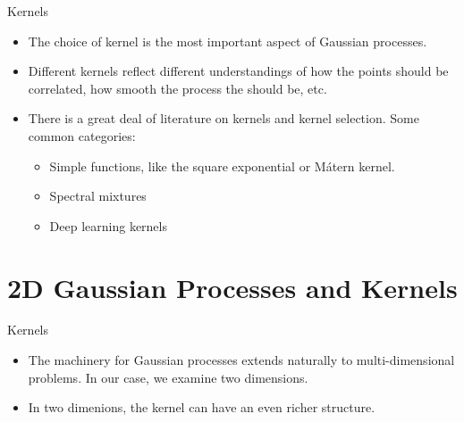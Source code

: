 \documentclass[10pt]{beamer}
\begin{document}
\begin{frame}{Kernels}
  \begin{itemize}
  \item The choice of kernel is the most important aspect of Gaussian processes. 
  \item Different kernels reflect different understandings of how the points should be correlated, how smooth the process the should be, etc. 
  \item There is a great deal of literature on kernels and kernel selection. Some common categories:
    \begin{itemize}
    \item Simple functions, like the square exponential or M\'atern kernel.
    \item Spectral mixtures
    \item Deep learning kernels
    \end{itemize}
  \end{itemize}

  \begin{center}
  \end{center}
\end{frame}


\section[2D Regression]{2D Gaussian Processes and Kernels}
\label{sec:2d-gauss-proc}
\begin{frame}{Kernels}
  \begin{itemize}
  \item The machinery for Gaussian processes extends naturally to multi-dimensional problems. In our case, we examine two dimensions.
  \item In two dimenions, the kernel can have an even richer structure. 
  \end{itemize}

  \begin{center}
  \end{center}

\end{frame}
\end{document}
